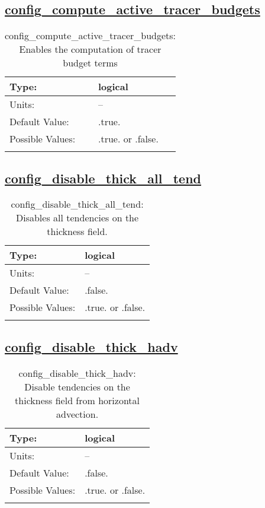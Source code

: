 \subsection[config\_compute\_active\_tracer\_budgets]{\hyperref[sec:nm_tab_debug]{config\_compute\_active\_tracer\_budgets}}
\label{subsec:nm_sec_config_compute_active_tracer_budgets}
\begin{center}
\begin{longtable}{| p{2.0in} || p{4.0in} |}
    \hline
    Type: & logical \\
    \hline
    Units: & -- \\
    \hline
    Default Value: & .true. \\
    \hline
    Possible Values: & .true. or .false. \\
    \hline
    \caption{config\_compute\_active\_tracer\_budgets: Enables the computation of tracer budget terms}
\end{longtable}
\end{center}
\subsection[config\_disable\_thick\_all\_tend]{\hyperref[sec:nm_tab_debug]{config\_disable\_thick\_all\_tend}}
\label{subsec:nm_sec_config_disable_thick_all_tend}
\begin{center}
\begin{longtable}{| p{2.0in} || p{4.0in} |}
    \hline
    Type: & logical \\
    \hline
    Units: & -- \\
    \hline
    Default Value: & .false. \\
    \hline
    Possible Values: & .true. or .false. \\
    \hline
    \caption{config\_disable\_thick\_all\_tend: Disables all tendencies on the thickness field.}
\end{longtable}
\end{center}
\subsection[config\_disable\_thick\_hadv]{\hyperref[sec:nm_tab_debug]{config\_disable\_thick\_hadv}}
\label{subsec:nm_sec_config_disable_thick_hadv}
\begin{center}
\begin{longtable}{| p{2.0in} || p{4.0in} |}
    \hline
    Type: & logical \\
    \hline
    Units: & -- \\
    \hline
    Default Value: & .false. \\
    \hline
    Possible Values: & .true. or .false. \\
    \hline
    \caption{config\_disable\_thick\_hadv: Disable tendencies on the thickness field from horizontal advection.}
\end{longtable}
\end{center}
